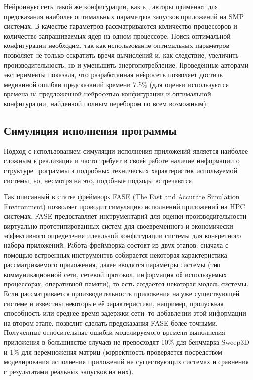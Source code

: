 		Нейронную сеть такой же конфигурации, как в \cite{ML_SMG2000}, авторы \cite{ML_PROC_KERN} применют для предсказания наиболее оптимальных параметров запусков приложений на SMP системах. В качестве параметров рассматриваются количество процессоров и количество запрашиваемых ядер на одном процессоре. Поиск оптимальной конфигурации необходим, так как использование оптимальных параметров позволяет не только сократить время вычислений и, как следствие, увеличить производительность, но и уменьшить энергопотребление. Проведённые авторами эксперименты показали, что разработанная нейросеть позволяет достичь медианной ошибки предсказаний времени 7.5\% (для оценки используются времена на предложенной нейросетью конфигурации и оптимальной конфигурации, найденной полным перебором по всем возможным).

	\subsection{Симуляция исполнения программы}
		Подход с использованием симуляции исполнения приложений является наиболее сложным в реализации и часто требует в своей работе наличие информации о структуре программы и подробных технических характеристик используемой системы, но, несмотря на это, подобные подходы встречаются.

		Так описанный в статье \cite{simulation_FASE} фреймворк FASE (The Fast and Accurate Simulation Environment) позволяет проводит симуляцию исполнений приложений на HPC системах. FASE предоставляет инструментарий для оценки производительности виртуально-прототипированных систем для своевременного и экономически эффективного определения идеальной конфигурации системы для конкретного набора приложений. Работа фреймворка состоит из двух этапов: сначала с помощью встроенных инструментов собирается некоторая характеристика рассматриваемого приложения, далее вводятся параметры системы (тип коммуникационной сети, сетевой протокол, информация об используемых процессорах, оперативной памяти), то есть создаётся некоторая модель системы. Если рассматривается производительность приложения на уже существующей системе и известны некоторые её характеристики, например, пропускная способность или среднее время задержки сети, то добавлении этой информации на втором этапе, позволит сделать предсказания FASE более точными. Полученные относительные ошибки моделируемого времени выполнения приложения в большинстве случаев не превосходят 10\% для бенчмарка Sweep3D и 1\% для перемножения матриц (корректность проверяется посредством моделирования исполнения приложений на существующих системах и сравнения с результатами реальных запусков на них).
		
